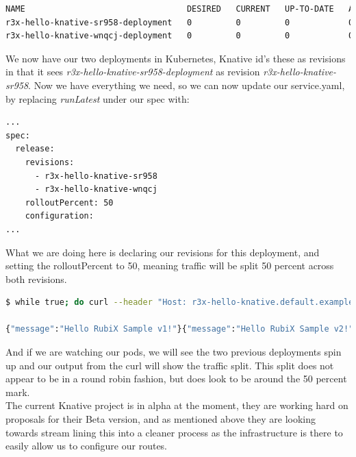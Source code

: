 \begin{lstlisting}[language=bash]
NAME                                 DESIRED   CURRENT   UP-TO-DATE   AVAILABLE   AGE
r3x-hello-knative-sr958-deployment   0         0         0            0           1m
r3x-hello-knative-wnqcj-deployment   0         0         0            0           3m
\end{lstlisting}
We now have our two deployments in Kubernetes, Knative id's these as revisions in that it sees \textit{r3x-hello-knative-sr958-deployment} as revision \textit{r3x-hello-knative-sr958}. Now we have everything we need, so we can now update our service.yaml, by replacing \textit{runLatest} under our spec with:
\begin{lstlisting}[language=bash]
...
spec:
  release:
    revisions:
      - r3x-hello-knative-sr958
      - r3x-hello-knative-wnqcj
    rolloutPercent: 50
    configuration:
...
\end{lstlisting}
What we are doing here is declaring our revisions for this deployment, and setting the rolloutPercent to 50, meaning traffic will be split 50 percent across both revisions.
\begin{lstlisting}[language=bash]
$ while true; do curl --header "Host: r3x-hello-knative.default.example.com" http://35.197.208.7;done

{"message":"Hello RubiX Sample v1!"}{"message":"Hello RubiX Sample v2!"}{"message":"Hello RubiX Sample v1!"}{"message":"Hello RubiX Sample v1!"}...
\end{lstlisting}
And if we are watching our pods, we will see the two previous deployments spin up and our output from the curl will show the traffic split. This split does not appear to be in a round robin fashion, but does look to be around the 50 percent mark. 
\\The current Knative project is in alpha at the moment, they are working hard on proposals for their Beta version, and as mentioned above they are looking towards stream lining this into a cleaner process as the infrastructure is there to easily allow us to configure our routes.


